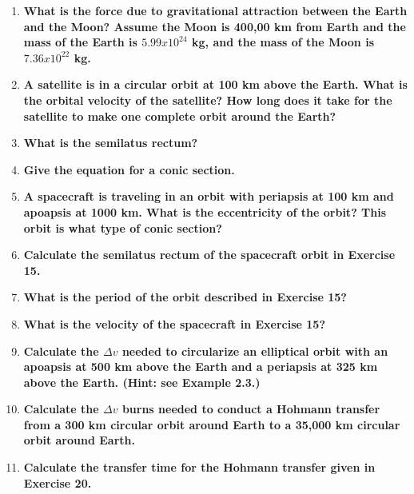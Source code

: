 \begin{enumerate}
	\item {\bf What is the force due to gravitational attraction between the Earth and the Moon? Assume the Moon is 400,00 km from Earth and the mass of the Earth is $5.99 x 10^{24}$ kg, and the mass of the Moon is $7.36 x 10^{22}$ kg.} 	

	\item {\bf  A satellite is in a circular orbit at 100 km above the Earth. What is the orbital velocity of the satellite? How long does it take for the satellite to make one complete orbit around the Earth?} \\
	
	\item {\bf What is the semilatus rectum?} \\
	
	\item {\bf  Give the equation for a conic section.} \\
	
	\item {\bf  A spacecraft is traveling in an orbit with periapsis at 100 km and apoapsis at 1000 km. What is the eccentricity of the orbit? This orbit is what type of conic section?} \\
	
	\item {\bf Calculate the semilatus rectum of the spacecraft orbit in Exercise 15.} \\
	
	\item {\bf What is the period of the orbit described in Exercise 15?} \\
	
	\item {\bf What is the velocity of the spacecraft in Exercise 15?} \\
	
	\item {\bf Calculate the  $\Delta v$ needed to circularize an elliptical orbit with an apoapsis at 500 km above the Earth and a periapsis at 325 km above the Earth. (Hint: see Example 2.3.)} \\
	
	\item {\bf Calculate the $\Delta v$ burns needed to conduct a Hohmann transfer from a 300 km circular orbit around Earth to a 35,000 km circular orbit around Earth.} \\	
	
	\item {\bf Calculate the transfer time for the Hohmann transfer given in Exercise 20.} \\	


\end{enumerate}

